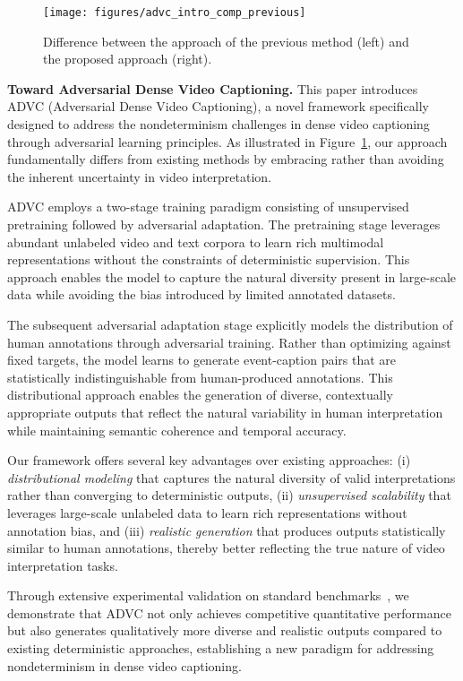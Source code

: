 \begin{figure}[t]
    \centering
    \texttt{[image: figures/advc\_intro\_comp\_previous]}
    \caption{Difference between the approach of the previous method (left) and the proposed approach (right).}
    \label{fig:intro_approach}
\end{figure}

\textbf{Toward Adversarial Dense Video Captioning.}
This paper introduces ADVC (Adversarial Dense Video Captioning), a novel framework specifically designed to address the nondeterminism challenges in dense video captioning through adversarial learning principles. As illustrated in Figure~\ref{fig:intro_approach}, our approach fundamentally differs from existing methods by embracing rather than avoiding the inherent uncertainty in video interpretation.

ADVC employs a two-stage training paradigm consisting of unsupervised pretraining followed by adversarial adaptation. The pretraining stage leverages abundant unlabeled video and text corpora to learn rich multimodal representations without the constraints of deterministic supervision. This approach enables the model to capture the natural diversity present in large-scale data while avoiding the bias introduced by limited annotated datasets.

The subsequent adversarial adaptation stage explicitly models the distribution of human annotations through adversarial training. Rather than optimizing against fixed targets, the model learns to generate event-caption pairs that are statistically indistinguishable from human-produced annotations. This distributional approach enables the generation of diverse, contextually appropriate outputs that reflect the natural variability in human interpretation while maintaining semantic coherence and temporal accuracy.

Our framework offers several key advantages over existing approaches: (i) \textit{distributional modeling} that captures the natural diversity of valid interpretations rather than converging to deterministic outputs, (ii) \textit{unsupervised scalability} that leverages large-scale unlabeled data to learn rich representations without annotation bias, and (iii) \textit{realistic generation} that produces outputs statistically similar to human annotations, thereby better reflecting the true nature of video interpretation tasks.

Through extensive experimental validation on standard benchmarks~\cite{Krishna2017-pw,Zhou2018-eq}, we demonstrate that ADVC not only achieves competitive quantitative performance but also generates qualitatively more diverse and realistic outputs compared to existing deterministic approaches, establishing a new paradigm for addressing nondeterminism in dense video captioning.


